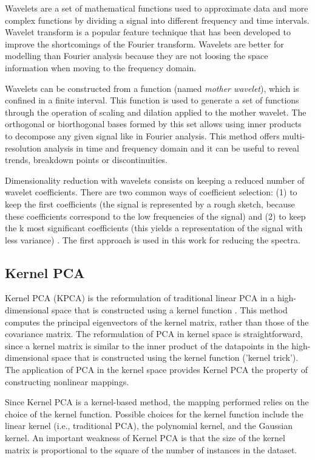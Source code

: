 \documentclass[a4paper,fleqn,usenatbib]{mnras}
\begin{document}
Wavelets \citep{mallat:98} are a set of mathematical functions used to
approximate data and more complex functions by dividing a signal into
different frequency and time intervals.  Wavelet transform is a
popular feature technique that has been developed to improve the
shortcomings of the Fourier transform. Wavelets are better for
modelling than Fourier analysis because they are not loosing the space
information when moving to the frequency domain.

Wavelets can be constructed from a function (named \textit{mother
  wavelet}), which is confined in a finite interval. This function is
used to generate a set of functions through the operation of scaling
and dilation applied to the mother wavelet. The orthogonal or
biorthogonal bases formed by this set allows using inner products to
decompose any given signal like in Fourier analysis.  This method
offers multi-resolution analysis in time and frequency domain and it
can be useful to reveal trends, breakdown points or discontinuities.

Dimensionality reduction with wavelets consists on keeping a reduced
number of wavelet coefficients. There are two common ways of
coefficient selection: (1) to keep the first coefficients (the signal
is represented by a rough sketch, because these coefficients
correspond to the low frequencies of the signal) and (2) to keep the k
most significant coefficients (this yields a representation
  of the signal with less variance) \citep{li:10}. The first
approach is used in this work for reducing the spectra.

\subsection{Kernel PCA}

Kernel PCA (KPCA) is the reformulation of traditional linear PCA in a
high-dimensional space that is constructed using a kernel function
\citep{sholkopf:98}. This method computes the principal eigenvectors of
the kernel matrix, rather than those of the covariance matrix. The
reformulation of PCA in kernel space is straightforward, since a
kernel matrix is similar to the inner product of the datapoints in the
high-dimensional space that is constructed using the kernel function
('kernel trick'). The application of PCA in the kernel space provides
Kernel PCA the property of constructing nonlinear mappings.

Since Kernel PCA is a kernel-based method, the mapping performed
relies on the choice of the kernel function. Possible choices for the
kernel function include the linear kernel (i.e., traditional PCA), the
polynomial kernel, and the Gaussian kernel. An important weakness of
Kernel PCA is that the size of the kernel matrix is proportional to
the square of the number of instances in the dataset.
\end{document}
